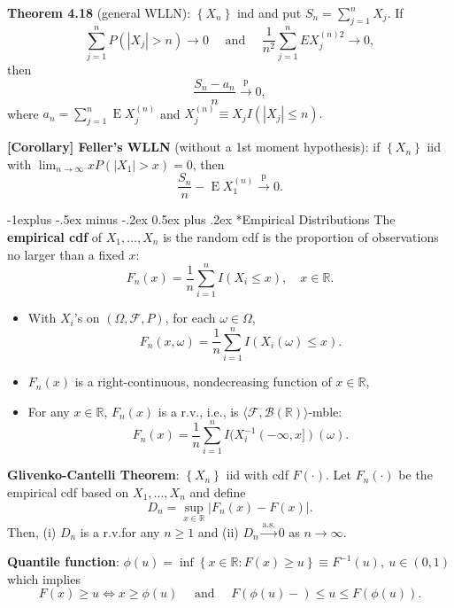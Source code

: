 \documentclass[paper=letter,fontsize=3mm]{scrartcl}
\makeatletter
\DeclareMathOperator{\E}{E}
\newcommand{\convprob}{\stackrel{\text{p}}{\longrightarrow}}
\newcommand{\convas}{\stackrel{\text{a.s.}}{\longrightarrow}}
\newcommand{\Borel}{\mathcal{B}}
\newcommand{\R}{\mathbb{R}}
\newcommand\abs[1]{\left| #1 \right|}
\newcommand\set[1]{\left\{ #1 \right\}}
\renewcommand{\subsection}{\@startsection{subsection}{2}{0mm}%
                                {-1explus -.5ex minus -.2ex}%
                                {0.5ex plus .2ex}%
                                {\normalfont\normalsize\bfseries}}
\makeatother
\begin{document}
\begin{multicols*}{3}
\textbf{Theorem 4.18} (general WLLN): $\set{X_n}$ ind and put $S_n = \sum_{j=1}^n X_j$. If
$$ \sum_{j=1}^n P(\abs{X_j} > n) \to 0 \quad \text{ and } \quad \frac{1}{n^2} \sum_{j=1}^n E X_j^{(n)2} \to 0,$$
then $$\frac{S_n-a_n}{n}\convprob 0,$$
where $a_n = \sum_{j=1}^n \E X_j^{(n)}$ and $X_j^{(n)} \equiv X_j I(\abs{X_j} \le n).$ \\ \medskip

\textbf{[Corollary] Feller's WLLN} (without a 1st moment hypothesis): if $\set{X_n}$ iid with $\lim_{n\to\infty} xP(\abs{X_1}>x) = 0$, then $$\frac{S_n}{n} - \E X_1^{(n)} \convprob 0.$$


\subsection*{Empirical Distributions}
The \textbf{empirical cdf} of $X_1, \dots, X_n$ is the random cdf is the proportion of observations no larger than a fixed $x$:
$$F_n(x) = \frac{1}{n} \sum_{i=1}^n I(X_i \le x), \quad x \in \R.$$

\begin{itemize}
\item With $X_i$'s on $(\Omega, \mathcal{F}, P)$, for each $\omega \in \Omega$,
$$F_n(x, \omega) = \frac{1}{n} \sum_{i=1}^n I(X_i(\omega) \le x).$$
\item $F_n(x)$ is a right-continuous, nondecreasing function of $x \in \R$,
\item For any $x \in \R$, $F_n(x)$ is a r.v., i.e., is $\langle \mathcal{F}, \Borel(\R)\rangle$-mble:
$$F_n(x) = \frac{1}{n}\sum_{i=1}^n I(X_i^{-1}(-\infty,x])(\omega).$$
\end{itemize}

\textbf{Glivenko-Cantelli Theorem}: $\set{X_n}$ iid with cdf $F(\cdot)$. Let $F_n(\cdot)$ be the empirical cdf based on $X_1, \dots, X_n$ and define 
$$D_n = \sup_{x\in\R} \abs{F_n(x) - F(x)}.$$
Then, (i) $D_n$ is a r.v.\@ for any $n \ge 1$ and (ii) $D_n \convas 0$ as $n \to \infty$. \\ \medskip

\textbf{Quantile function}: $\phi(u) = \inf\set{x \in \R: F(x) \ge u} \equiv F^{-1}(u), ~u \in (0,1)$ which implies
$$F(x) \ge u \iff x \ge \phi(u) \quad \text{ and } \quad F(\phi(u)-) \le u \le F(\phi(u)).$$


\end{multicols*}
\end{document}

